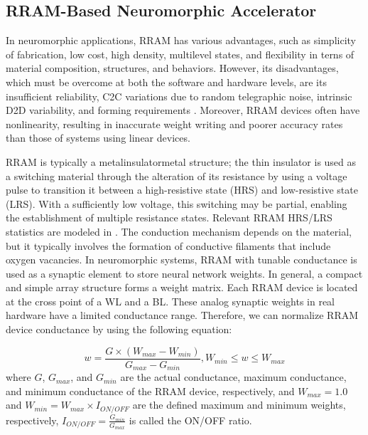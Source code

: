 \documentclass[journal]{IEEEtran}
\begin{document}

\subsection{RRAM-Based Neuromorphic Accelerator}
In neuromorphic applications, RRAM has various advantages, such as simplicity of fabrication, low cost, high density, multilevel states, and flexibility in terns of material composition, structures, and behaviors. However, its disadvantages, which must be overcome at both the software and hardware levels, are its insufficient reliability, C2C variations due to random telegraphic noise, intrinsic D2D variability, and forming requirements \cite{NVM_review}. Moreover, RRAM devices often have nonlinearity, resulting in inaccurate weight writing and poorer accuracy rates than those of systems using linear devices.


RRAM is typically a metal\textendash insulator\textendash metal structure; the thin insulator is used as a switching material through the alteration of its resistance by using a voltage pulse to transition it between a high-resistive state (HRS) and low-resistive state (LRS). With a sufficiently low voltage, this switching may be partial, enabling the establishment of multiple resistance states. Relevant RRAM HRS/LRS statistics are modeled in \cite{CIMulator_v1}. The conduction mechanism depends on the material, but it typically involves the formation of conductive filaments that include oxygen vacancies. In neuromorphic systems, RRAM with tunable conductance is used as a synaptic element to store  neural network weights. In general, a compact and simple array structure forms a weight matrix. Each RRAM device is located at the cross point of a WL and a BL. These analog synaptic weights in real hardware have a limited conductance range. Therefore, we can normalize RRAM device conductance by using the following equation:

\begin{equation}
w=\frac{G\times(W_{max}-W_{min})}{G_{max}-G_{min}}, W_{min}\le{w}\le{W_{max}}
\label{w_RAM}
\end{equation}
where $G$, $G_{max}$, and $G_{min}$ are the actual conductance, maximum conductance, and minimum conductance of the RRAM device, respectively, and $W_{max}=1.0$ and $W_{min}=W_{max}\times{I_{ON/OFF}}$ are the defined maximum and minimum weights, respectively, $I_{ON/OFF}=\frac{G_{min}}{G_{max}}$ is called the ON/OFF ratio.
\end{document}
